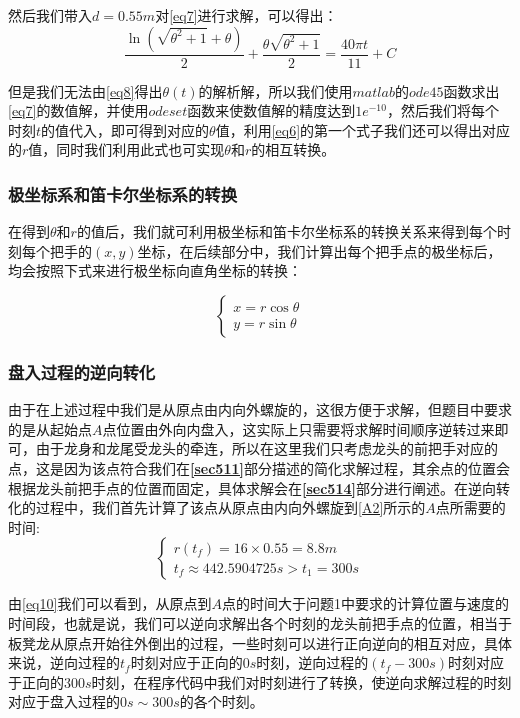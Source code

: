 \documentclass[withoutpreface,bwprint]{cumcmthesis} %
\begin{document}
然后我们带入$d=0.55m$对\cref{eq7}进行求解，可以得出：
\begin{equation}
\frac{\ln{(\sqrt{\theta^2 + 1} + \theta)}}{2} + \frac{\theta\sqrt{\theta^2 + 1}}{2} = 
\frac{40\pi t}{11} + C
\label{eq8}
\end{equation}

但是我们无法由\cref{eq8}得出$\theta(t)$的解析解，所以我们使用$matlab$的$ode45$函数求出\cref{eq7}的数值解，并使用$odeset$函数来使数值解的精度达到$1e^{-10}$，然后我们将每个时刻$t$的值代入，即可得到对应的$\theta$值，利用\cref{eq6}的第一个式子我们还可以得出对应的$r$值，同时我们利用此式也可实现$\theta$和$r$的相互转换。

\subsubsection{极坐标系和笛卡尔坐标系的转换}
\label{sec512}
在得到$\theta$和$r$的值后，我们就可利用极坐标和笛卡尔坐标系的转换关系来得到每个时刻每个把手的$(x,y)$坐标，在后续部分中，我们计算出每个把手点的极坐标后，均会按照下式来进行极坐标向直角坐标的转换\cite{2}：

\begin{equation}
\begin{cases}
    x = r\cos{\theta}\\
    y = r\sin{\theta}
\end{cases}
\label{eq9}
\end{equation}

\subsubsection{盘入过程的逆向转化}
\label{sec513}
由于在上述过程中我们是从原点由内向外螺旋的，这很方便于求解，但题目中要求的是从起始点$A$点位置由外向内盘入，这实际上只需要将求解时间顺序逆转过来即可，由于龙身和龙尾受龙头的牵连，所以在这里我们只考虑龙头的前把手对应的点，这是因为该点符合我们在\textbf{\ref{sec511}}部分描述的简化求解过程，其余点的位置会根据龙头前把手点的位置而固定，具体求解会在\textbf{\ref{sec514}}部分进行阐述。在逆向转化的过程中，我们首先计算了该点从原点由内向外螺旋到\cref{A2}所示的$A$点所需要的时间:
\begin{equation}
\begin{cases}
    r(t_f)=16\times0.55=8.8m\\
    t_f\approx 442.5904725s > t_1 = 300s
\end{cases}
\label{eq10}
\end{equation}

由\cref{eq10}我们可以看到，从原点到$A$点的时间大于问题1中要求的计算位置与速度的时间段，也就是说，我们可以逆向求解出各个时刻的龙头前把手点的位置，相当于板凳龙从原点开始往外倒出的过程，一些时刻可以进行正向逆向的相互对应，具体来说，逆向过程的$t_f$时刻对应于正向的$0s$时刻，逆向过程的$(t_f-300s)$时刻对应于正向的$300s$时刻，在程序代码中我们对时刻进行了转换，使逆向求解过程的时刻对应于盘入过程的$0s\sim 300s$的各个时刻。
\end{document}

